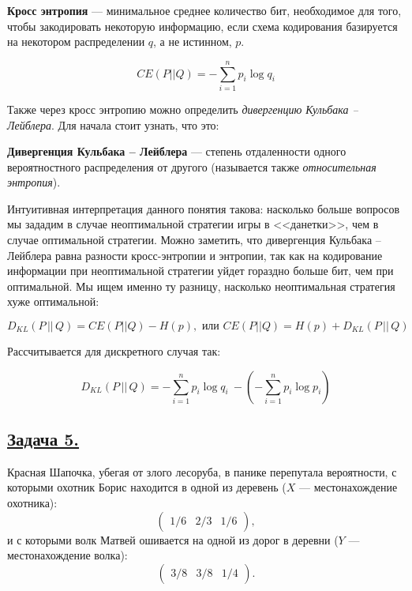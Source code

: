 \begin{siderules}
    \textbf{Кросс энтропия} --- минимальное среднее количество бит, необходимое для того, чтобы закодировать некоторую информацию, если схема кодирования базируется на некотором распределении $q$, а не истинном, $p$.
\end{siderules}

\[CE(P||Q)=-\sum\limits_{i=1}^{n}p_i\log q_i \]

Также через кросс энтропию можно определить \textit{дивергенцию Кульбака -- Лейблера}. Для начала стоит узнать, что это:

\begin{siderules}
    \textbf{Дивергенция Кульбака -- Лейблера} --- степень отдаленности одного вероятностного распределения от другого (называется также \textit{относительная энтропия}). \end{siderules}
    
    Интуитивная интерпретация данного понятия такова: насколько больше вопросов мы зададим в случае неоптимальной стратегии игры в <<данетки>>, чем в случае оптимальной стратегии. Можно заметить, что дивергенция Кульбака -- Лейблера равна разности кросс-энтропии и энтропии, так как на кодирование информации при неоптимальной стратегии уйдет гораздно больше бит, чем при оптимальной. Мы ищем именно ту разницу, насколько неоптимальная стратегия хуже оптимальной: 
    
    \[D_{KL}(P\, ||\, Q)= CE(P||Q) - H(p), \text{ или } CE(P||Q)=H(p)+D_{KL}(P\, || \, Q)\]
    
    Рассчитывается для дискретного случая так:

    \[D_{KL}(P\, ||\, Q)=  - \sum\limits_{i=1}^n p_i\log q_i\ - ( - \sum\limits_{i=1}^n p_i\log p_i)\]



\subsection*{\hyperref[sec:sol_problem5]{Задача 5.}}\label{sec:problem5} Красная Шапочка, убегая от злого лесоруба, в панике перепутала вероятности, с которыми охотник Борис находится в одной из деревень ($X$ --- местонахождение охотника):
\[\begin{pmatrix}
    1/6 & 2/3 & 1/6
\end{pmatrix} , \] и с которыми волк Матвей ошивается на одной из дорог в деревни ($Y$ --- местонахождение волка):
\[\begin{pmatrix}
    3/8 & 3/8 & 1/4 
\end{pmatrix} .\]

